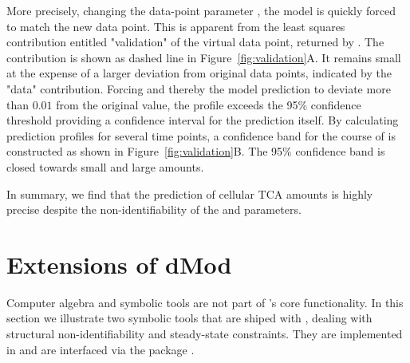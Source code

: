 \documentclass[article]{jss}
\begin{document}
More precisely, changing the data-point parameter , the model is quickly forced to
match the new data point. This is apparent from the least squares contribution entitled "validation" of the virtual data point, returned by . 
The contribution is shown as dashed line in Figure~\ref{fig:validation}A. It remains small at the expense of a larger deviation from original data points, indicated by the "data" contribution. 
Forcing  and thereby the model
prediction to deviate more than $0.01$ from the original value, the profile
exceeds the 95\% confidence threshold providing a confidence interval for the
prediction itself. By calculating
prediction profiles for several time points, a confidence band for the course of
 is constructed as shown in Figure~\ref{fig:validation}B. The
95\% confidence band is closed towards small and large amounts.

In summary, we find that the prediction of cellular TCA amounts is highly
precise despite the non-identifiability of the  and
 parameters.

\section{Extensions of dMod}
\label{sec:extensions}
Computer algebra and symbolic tools are not part of 's core functionality. In this section we illustrate two symbolic tools that are shiped with ,  dealing with structural non-identifiability and steady-state constraints. They are implemented in  and are interfaced via the  package \citep{rPython}.
\end{document}
